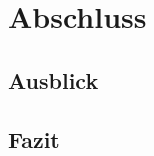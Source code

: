 
\chapter{Abschluss} %
\label{cha:abschluss}

\section{Ausblick} %
\label{sec:ausblick}


\section{Fazit} %
\label{sec:fazit}




